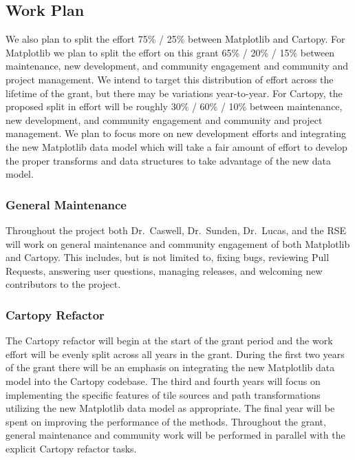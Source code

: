 \documentclass[12pt]{article}
\numberwithin{page}{section}
\begin{document}
\subsection{Work Plan}

We also plan to split the effort 75\% / 25\% between
Matplotlib and Cartopy.  For Matplotlib we plan to split the effort on this
grant 65\% / 20\% / 15\% between maintenance, new development, and community
engagement and community and project management.  We intend to target this distribution
of effort across the lifetime of the grant, but there may be variations year-to-year.
For Cartopy, the proposed split in effort will be roughly 30\% / 60\% / 10\%
between maintenance, new development, and community engagement and community
and project management.  We plan to focus more on new development efforts and
integrating the new Matplotlib data model which will take a fair amount of
effort to develop the proper transforms and data structures to take advantage
of the new data model.


\subsubsection{General Maintenance}

Throughout the project both Dr.\ Caswell, Dr.\ Sunden, Dr.\ Lucas, and the RSE
will work on general maintenance and community engagement of both Matplotlib
and Cartopy.  This includes, but is not limited to, fixing bugs, reviewing Pull
Requests, answering user questions, managing releases, and welcoming new
contributors to the project.


\subsubsection{Cartopy Refactor}

The Cartopy refactor will begin at the start of the grant period
and the work effort will be evenly split across all years in the grant.
During the first two years of the grant there will be an emphasis on
integrating the new Matplotlib data model into the Cartopy codebase.
The third and fourth years will focus on implementing the specific
features of tile sources and path transformations utilizing the new
Matplotlib data model as appropriate. The final year will be spent on
improving the performance of the methods. Throughout the grant, general
maintenance and community work will be performed in parallel with the
explicit Cartopy refactor tasks.
\end{document}
